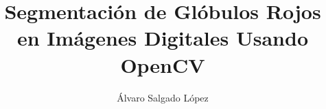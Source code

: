 \documentclass[journal]{IEEEtran}
\begin{document}
%
\title{Segmentación de Glóbulos Rojos en Imágenes Digitales Usando OpenCV}


\author{Álvaro Salgado López}

% 
%














\maketitle
\end{document}
